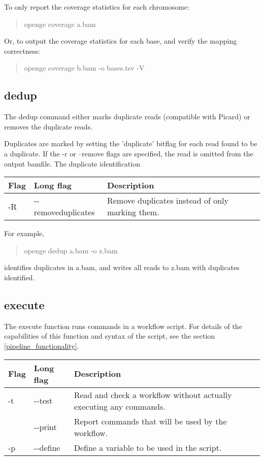 \documentclass[11pt]{article}
\newcommand {\cmd}[1] {\begin{quote}#1\end{quote}}
\begin{document}
To only report the coverage statistics for each chromosome:
\cmd{openge coverage a.bam}

Or, to output the coverage statistics for each base, and verify the mapping correctness:
\cmd{openge coverage b.bam -o bases.tsv -V}

\subsection {dedup}
The dedup command either marks duplicate reads (compatible with Picard) or removes the duplicate reads. 

Duplicates are marked by setting the 'duplicate' bitflag for each read found to be a duplicate. If the -r or --remove flags are specified, the read is omitted from the output bamfile. The duplicate identification 

\begin{center}
\begin{tabular}{llp{3.5in}}
\hline
Flag&Long flag&Description\\ \hline
-R&{-}{-}removeduplicates&Remove duplicates instead of only marking them.\\
\end{tabular}
\end{center}

For example,
\cmd{openge dedup a.bam -o z.bam} 
identifies duplicates in a.bam, and writes all reads to z.bam with duplicates identified.

\subsection {execute}
\label{execute}

The execute function runs commands in a workflow script. For details of the capabilities of this function and syntax of the script, see the section \ref{pipeline_functionality}.

\begin{center}
\begin{tabular}{llp{4.5in}}
\hline
Flag&Long flag&Description\\ \hline
-t&{-}{-}test&Read and check a workflow without actually executing any commands.\\
&{-}{-}print&Report commands that will be used by the workflow.\\
-p&{-}{-}define&Define a variable to be used in the script.\\
\end{tabular}
\end{center}
\end{document}
